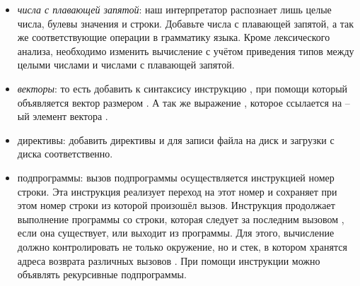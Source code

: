 \begin{itemize}
	\item {\it числа с плавающей запятой}: наш интерпретатор распознает лишь 
целые числа, булевы значения и строки. Добавьте числа с плавающей запятой, а так 
же соответствующие операции в грамматику языка. Кроме лексического анализа, 
необходимо изменить вычисление с учётом приведения типов между целыми числами и 
числами с плавающей запятой.

	\item {\it векторы}: то есть добавить к синтаксису инструкцию , при помощи который объявляется вектор  размером . А 
так же выражение , которое ссылается на --ый элемент 
вектора .

	\item директивы: добавить директивы  и  для записи файла на диск и загрузки с диска соответственно.

	\item подпрограммы: вызов подпрограммы осуществляется инструкцией 
 номер строки. Эта инструкция реализует переход на этот номер и 
сохраняет при этом номер строки из которой произошёл вызов. Инструкция 
 продолжает выполнение программы со строки, которая следует за 
последним вызовом , если она существует, или выходит из программы. 
Для этого, вычисление должно контролировать не только окружение, но и стек, в 
котором хранятся адреса возврата различных вызовов . При помощи 
инструкции  можно объявлять рекурсивные подпрограммы.
\end{itemize}
